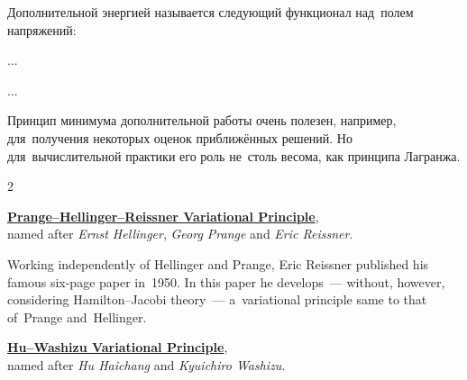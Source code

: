 \begin{otherlanguage}{russian}
Дополнительной энергией называется следующий функционал над~полем напряжений:

...



...

Принцип минимума дополнительной работы очень полезен, например, для~получения некоторых оценок приближённых решений. Но для~вычислительной практики его роль не~столь весома, как принципа Лагранжа.



\label{para:mixedvariationalprinciples}

\begin{changemargin}{2\parindent}{\parindent}
\bgroup %
\setlength{\parindent}{\negparindent}
\small 

\hspace{\parindent}\href{https://en.wikiversity.org/wiki/Introduction_to_Elasticity/Hellinger-Reissner_principle}{\textbf{Prange\hbox{--}Hellinger\hbox{--}Reissner Variational Principle}},\\
named after \emph{Ernst Hellinger}, \emph{Georg Prange} and \emph{Eric Reissner}.
\par

\nopagebreak\vspace{0.16em}
{\scriptsize \noindent Working independently of Hellinger and Prange, Eric Reissner published his famous six\hbox{-}page paper  in~1950. In this paper he develops~--- without, however, considering Hamilton\hbox{--}Jacobi theory~--- a~variational principle same to that of~Prange and~Hellinger.\par}

\nopagebreak\vspace{0.32em}
\href{https://en.wikiversity.org/wiki/Introduction_to_Elasticity/Hu-Washizu_principle}{\textbf{Hu\hbox{--}Washizu Variational Principle}},\\
named after \emph{Hu Haichang} and \emph{Kyuichiro Washizu}.
\par
\egroup
\nopagebreak\vspace{0.1em}
\end{changemargin}


\end{otherlanguage}
